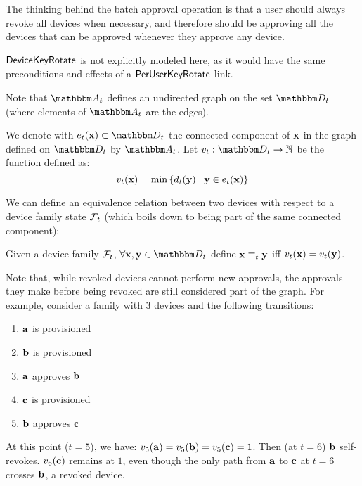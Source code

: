 \begin{definition}
\end{definition}

The thinking behind the batch approval operation is that a user should always
revoke all devices when necessary, and therefore should be approving all the
devices that can be approved whenever they approve any device.

$\mathsf{DeviceKeyRotate}{}$ is not explicitly modeled here, as it would have the same preconditions and effects of a $\mathsf{PerUserKeyRotate}{}$ link.

Note that $\zset{a}_t$ defines an undirected graph on the set $\zset{D}_t$ (where elements of $\zset{a}_t$ are the edges). 

\begin{definition}
  We denote with $\zeq_t(\zdev{x}) \subset \zset{D}_t$ the connected component of $\mathbf{x}$ in the graph defined on $\zset{D}_t$ by $\zset{A}_t$. 
  Let $\zverif_t : \zset{d}_t \rightarrow \integers$ be the function defined as:
\[
v_{t}(\mathbf{x}) = \min \left\{
      d_t(\mathbf{y})  
 \;|\; \mathbf{y}  \in e_t(\mathbf{x}) 
     \right\}
\]
\end{definition}

We can define an equivalence relation between two devices with respect to a device family state $\mathcal{F}_{t}$ (which boils down to being part of the same connected component):

\begin{definition}
  Given a device family $\mathcal{F}_{t}$, $\forall \zdev{x},\zdev{y} \in \zset{D}_t$ 
  define $\mathbf{x} \equiv_{t} \mathbf{y}$ 
  iff $v_t(\mathbf{x}) = v_t(\mathbf{y})$.
\end{definition}

Note that, while revoked devices cannot perform new approvals, the approvals they make before being revoked are still considered part of the graph. 
For example, consider a family with 3 devices and the following transitions: 
\begin{enumerate}
  \item $\mathbf{a}$ is provisioned
  \item $\mathbf{b}$ is provisioned
  \item $\mathbf{a}$ approves $\mathbf{b}$
  \item $\mathbf{c}$ is provisioned
  \item $\mathbf{b}$ approves $\mathbf{c}$
\end{enumerate}
At this point ($t=5$), we have:
$v_5(\mathbf{a}) = v_5(\mathbf{b}) = v_5(\mathbf{c}) = 1$.
Then (at $t=6$) $\mathbf{b}$ self-revokes. $v_6(\mathbf{c})$ remains at $1$,
even though the only path from $\mathbf{a}$ to $\mathbf{c}$ at $t=6$
crosses $\mathbf{b}$, a revoked device.

